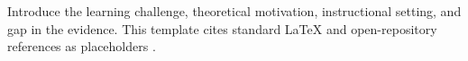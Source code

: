 \begin{sectionaccent}
Introduce the learning challenge, theoretical motivation, instructional setting, and gap in the evidence. This template cites standard LaTeX and open-repository references as placeholders \cite{lamport1994latex,zenodo}.

\end{sectionaccent}
